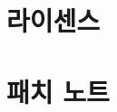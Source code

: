 \documentclass[8pt,b5paper]{book}
\let\oldhyperlink\hyperlink
\let\oldhref\href
\renewcommand{\hyperlink}[2]{#2(\pageref{#1}쪽)}
\renewcommand{\href}[2]{#2(\url{#1})}
\begin{document}
		\chapter*{라이센스}
			 
		
		\ifprintout\else
		\chapter*{패치 노트}
			
		
			\printindex
		\fi
	
	\vspace*{\fill}
	
	\ifprintout
		\let\hyperlink\oldhyperlink
		\let\href\oldhref
	\fi
	
	{\doclicenseThis}
	
	\ifprintout
		\let\oldhyperlink\hyperlink
		\let\oldhref\href
		
		\renewcommand{\hyperlink}[2]{#2(\pageref{#1} 쪽)}
		\renewcommand{\href}[2]{#2(\url{#1})}
	\fi
	
\end{document}
